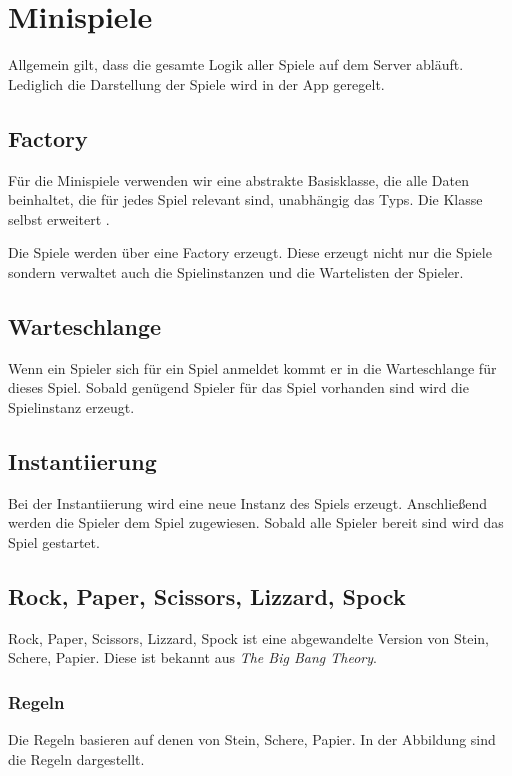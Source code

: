 \section{Minispiele}
Allgemein gilt, dass die gesamte Logik aller Spiele auf dem Server abläuft. Lediglich die Darstellung der Spiele wird in der App geregelt.

\subsection{Factory}
Für die Minispiele verwenden wir eine abstrakte Basisklasse, die alle Daten beinhaltet, die für jedes Spiel relevant sind, unabhängig das Typs. Die Klasse selbst erweitert .

Die Spiele werden über eine Factory erzeugt. Diese erzeugt nicht nur die Spiele sondern verwaltet auch die Spielinstanzen und die Wartelisten der Spieler. 

\subsection{Warteschlange}
Wenn ein Spieler sich für ein Spiel anmeldet kommt er in die Warteschlange für dieses Spiel. Sobald genügend Spieler für das Spiel vorhanden sind wird die Spielinstanz erzeugt.

\subsection{Instantiierung}
Bei der Instantiierung wird eine neue Instanz des Spiels erzeugt. Anschließend werden die Spieler dem Spiel zugewiesen. Sobald alle Spieler bereit sind wird das Spiel gestartet.

\subsection{Rock, Paper, Scissors, Lizzard, Spock}
Rock, Paper, Scissors, Lizzard, Spock ist eine abgewandelte Version von Stein, Schere, Papier. Diese ist bekannt aus \textit{The Big Bang Theory}. 

\subsubsection{Regeln}
Die Regeln basieren auf denen von Stein, Schere, Papier. In der Abbildung sind die Regeln dargestellt.

